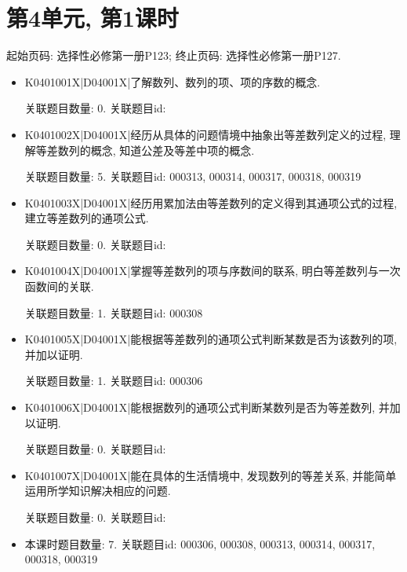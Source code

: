 \section*{第4单元, 第1课时}
起始页码: 选择性必修第一册P123; 终止页码: 选择性必修第一册P127.
\begin{itemize}
\item K0401001X|D04001X|了解数列、数列的项、项的序数的概念.

关联题目数量: 0. 关联题目id: 

\item K0401002X|D04001X|经历从具体的问题情境中抽象出等差数列定义的过程, 理解等差数列的概念, 知道公差及等差中项的概念.

关联题目数量: 5. 关联题目id: 000313, 000314, 000317, 000318, 000319

\item K0401003X|D04001X|经历用累加法由等差数列的定义得到其通项公式的过程, 建立等差数列的通项公式.

关联题目数量: 0. 关联题目id: 

\item K0401004X|D04001X|掌握等差数列的项与序数间的联系, 明白等差数列与一次函数间的关联.

关联题目数量: 1. 关联题目id: 000308

\item K0401005X|D04001X|能根据等差数列的通项公式判断某数是否为该数列的项, 并加以证明.

关联题目数量: 1. 关联题目id: 000306

\item K0401006X|D04001X|能根据数列的通项公式判断某数列是否为等差数列, 并加以证明.

关联题目数量: 0. 关联题目id: 

\item K0401007X|D04001X|能在具体的生活情境中, 发现数列的等差关系, 并能简单运用所学知识解决相应的问题.

关联题目数量: 0. 关联题目id: 

\item 本课时题目数量: 7. 关联题目id: 000306, 000308, 000313, 000314, 000317, 000318, 000319

\end{itemize}

